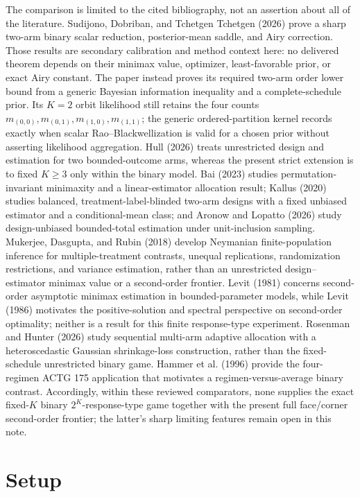 \documentclass{article}
\begin{document}
The comparison is limited to the cited bibliography, not an assertion about all of the literature. Sudijono, Dobriban, and Tchetgen Tchetgen (2026) prove a sharp two-arm binary scalar reduction, posterior-mean saddle, and Airy correction. Those results are secondary calibration and method context here: no delivered theorem depends on their minimax value, optimizer, least-favorable prior, or exact Airy constant. The paper instead proves its required two-arm order lower bound from a generic Bayesian information inequality and a complete-schedule prior. Its \(K=2\) orbit likelihood still retains the four counts \(m_{(0,0)},m_{(0,1)},m_{(1,0)},m_{(1,1)}\); the generic ordered-partition kernel records exactly when scalar Rao--Blackwellization is valid for a chosen prior without asserting likelihood aggregation. Hull (2026) treats unrestricted design and estimation for two bounded-outcome arms, whereas the present strict extension is to fixed \(K\geq3\) only within the binary model. Bai (2023) studies permutation-invariant minimaxity and a linear-estimator allocation result; Kallus (2020) studies balanced, treatment-label-blinded two-arm designs with a fixed unbiased estimator and a conditional-mean class; and Aronow and Lopatto (2026) study design-unbiased bounded-total estimation under unit-inclusion sampling. Mukerjee, Dasgupta, and Rubin (2018) develop Neymanian finite-population inference for multiple-treatment contrasts, unequal replications, randomization restrictions, and variance estimation, rather than an unrestricted design--estimator minimax value or a second-order frontier. Levit (1981) concerns second-order asymptotic minimax estimation in bounded-parameter models, while Levit (1986) motivates the positive-solution and spectral perspective on second-order optimality; neither is a result for this finite response-type experiment. Rosenman and Hunter (2026) study sequential multi-arm adaptive allocation with a heteroscedastic Gaussian shrinkage-loss construction, rather than the fixed-schedule unrestricted binary game. Hammer et al. (1996) provide the four-regimen ACTG 175 application that motivates a regimen-versus-average binary contrast. Accordingly, within these reviewed comparators, none supplies the exact fixed-\(K\) binary \(2^K\)-response-type game together with the present full face/corner second-order frontier; the latter's sharp limiting features remain open in this note.

\section{Setup}
\end{document}
